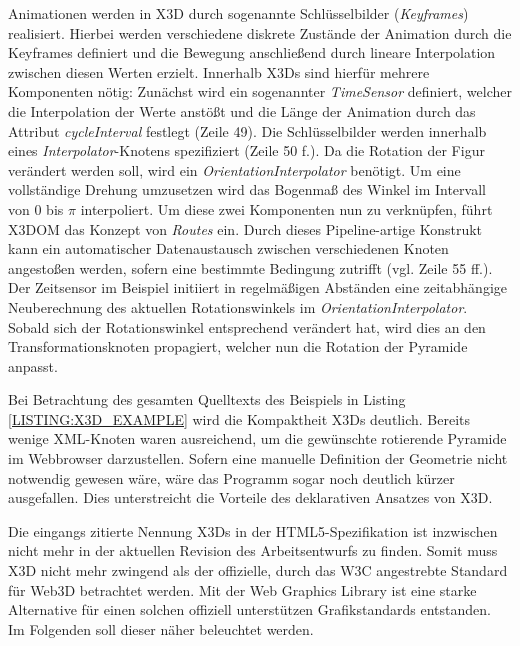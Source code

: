 Animationen werden in X3D durch sogenannte Schlüsselbilder (\emph{Keyframes}) realisiert. Hierbei werden verschiedene diskrete Zustände der Animation durch die Keyframes definiert und die Bewegung anschließend durch lineare Interpolation zwischen diesen Werten erzielt. Innerhalb X3Ds sind hierfür mehrere Komponenten nötig: Zunächst wird ein sogenannter \textit{TimeSensor} definiert, welcher die Interpolation der Werte anstößt und die Länge der Animation durch das Attribut \textit{cycleInterval} festlegt (Zeile 49). Die Schlüsselbilder werden innerhalb eines \textit{Interpolator}-Knotens spezifiziert (Zeile 50 f.). Da die Rotation der Figur verändert werden soll, wird ein \textit{OrientationInterpolator} benötigt. Um eine vollständige Drehung umzusetzen wird das Bogenmaß des Winkel im Intervall von $0$ bis $\pi$ interpoliert.
Um diese zwei Komponenten nun zu verknüpfen, führt X3DOM das Konzept von \textit{Routes} ein. Durch dieses Pipeline-artige Konstrukt kann ein automatischer Datenaustausch zwischen verschiedenen Knoten angestoßen werden, sofern eine bestimmte Bedingung zutrifft (vgl. Zeile 55 ff.). Der Zeitsensor im Beispiel initiiert in regelmäßigen Abständen eine zeitabhängige Neuberechnung des aktuellen Rotationswinkels im \textit{OrientationInterpolator}. Sobald sich der Rotationswinkel entsprechend verändert hat, wird dies an den Transformationsknoten propagiert, welcher nun die Rotation der Pyramide anpasst.

Bei Betrachtung des gesamten Quelltexts des Beispiels in Listing \ref{LISTING:X3D_EXAMPLE} wird die Kompaktheit X3Ds deutlich. Bereits wenige XML-Knoten waren ausreichend, um die gewünschte rotierende Pyramide im Webbrowser darzustellen. Sofern eine manuelle Definition der Geometrie nicht notwendig gewesen wäre, wäre das Programm sogar noch deutlich kürzer ausgefallen. Dies unterstreicht die Vorteile des deklarativen Ansatzes von X3D.

Die eingangs zitierte Nennung X3Ds in der HTML5-Spezifikation ist inzwischen nicht mehr in der aktuellen Revision des Arbeitsentwurfs zu finden. Somit muss X3D nicht mehr zwingend als der offizielle, durch das W3C angestrebte Standard für Web3D betrachtet werden. Mit der Web Graphics Library ist eine starke Alternative für einen solchen offiziell unterstützen Grafikstandards entstanden. Im Folgenden soll dieser näher beleuchtet werden.
